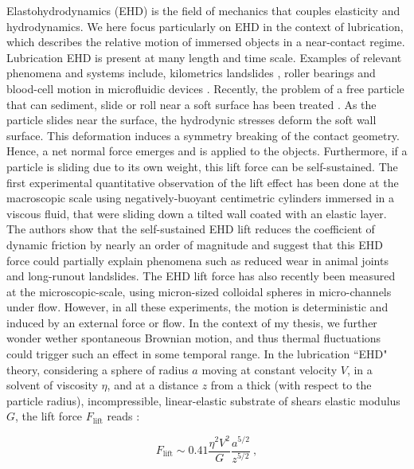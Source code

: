 Elastohydrodynamics (\gls{EHD}) is the field of mechanics that couples elasticity and hydrodynamics. We here focus particularly on \gls{EHD} in the context of lubrication, which describes the relative motion of immersed objects in a near-contact regime. Lubrication \gls{EHD} is present at many length and time scale. Examples of relevant phenomena and systems include, kilometrics landslides \cite{campbell_self-lubrication_1989}, roller bearings \cite{hamrock_fundamentals_2004} and blood-cell motion in microfluidic devices \cite{byun_characterizing_2013, higgins_sickle_2007, cohen_hydrodynamics_2013}. Recently, the problem of a free particle that can sediment, slide or roll near a soft surface has been treated  \cite{sekimoto_mechanism_1993,skotheim_soft_2004,skotheim_soft_2005,beaucourt_optimal_2004,salez_elastohydrodynamics_2015,bertin_soft-lubrication_2021}. As the particle slides near the surface, the hydrodynic stresses deform the soft wall surface. This deformation induces a symmetry breaking of the contact geometry. Hence, a net normal force emerges and is applied to the objects. Furthermore, if a particle is sliding due to its own weight, this lift force can be self-sustained. The first experimental quantitative observation of the lift effect has been done at the macroscopic scale using negatively-buoyant centimetric cylinders immersed in a viscous fluid, that were sliding down a tilted wall coated with an elastic layer. The authors show that the self-sustained \gls{EHD} lift reduces the coefficient of dynamic friction by nearly an order of magnitude and suggest that this \gls{EHD} force could partially explain phenomena such as reduced wear in animal joints and long-runout landslides. The \gls{EHD} lift force has also recently been measured at the microscopic-scale, using micron-sized colloidal spheres in micro-channels under flow. However, in all these experiments,  the motion is deterministic and induced by an external force or flow. In the context of my thesis, we further wonder wether spontaneous Brownian motion, and thus thermal fluctuations could trigger such an effect in some temporal range. In the lubrication ``\gls{EHD}" theory, considering a sphere of radius $a$ moving at constant velocity $V$, in a solvent of viscosity $\eta$, and at a distance $z$ from a thick (with respect to the particle radius), incompressible, linear-elastic substrate of shears elastic modulus $G$, the lift force $F_\mathrm{lift}$ reads \cite{skotheim_soft_2004}:

\begin{equation}
	F_\mathrm{lift} \sim 0.41\frac{\eta^2 V^2}{G} \frac{a^{5/2}}{z^{5/2}} ~,
	\label{Eq.lift_deter}
\end{equation}

